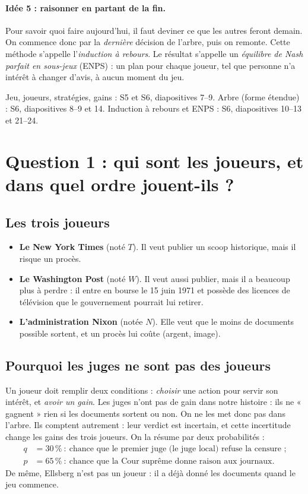 \documentclass[11pt,a4paper]{article}
\theoremstyle{definition}
\begin{document}
\paragraph{Idée 5 : raisonner en partant de la fin.} Pour savoir quoi faire aujourd'hui, il faut deviner ce que les autres feront demain. On commence donc par la \emph{dernière} décision de l'arbre, puis on remonte. Cette méthode s'appelle l'\emph{induction à rebours}. Le résultat s'appelle un \emph{équilibre de Nash parfait en sous-jeux} (ENPS) : un plan pour chaque joueur, tel que personne n'a intérêt à changer d'avis, à aucun moment du jeu.

\begin{cours}
Jeu, joueurs, stratégies, gains : S5 et S6, diapositives 7--9. Arbre (forme étendue) : S6, diapositives 8--9 et 14. Induction à rebours et ENPS : S6, diapositives 10--13 et 21--24.
\end{cours}

\section{Question 1 : qui sont les joueurs, et dans quel ordre jouent-ils ?}

\subsection{Les trois joueurs}
\begin{itemize}[leftmargin=*,itemsep=2pt]
\item \textbf{Le New York Times} (noté $T$). Il veut publier un scoop historique, mais il risque un procès.
\item \textbf{Le Washington Post} (noté $W$). Il veut aussi publier, mais il a beaucoup plus à perdre : il entre en bourse le 15 juin 1971 et possède des licences de télévision que le gouvernement pourrait lui retirer.
\item \textbf{L'administration Nixon} (notée $N$). Elle veut que le moins de documents possible sortent, et un procès lui coûte (argent, image).
\end{itemize}

\subsection{Pourquoi les juges ne sont pas des joueurs}
Un joueur doit remplir deux conditions : \emph{choisir} une action pour servir son intérêt, et \emph{avoir un gain}. Les juges n'ont pas de gain dans notre histoire : ils ne « gagnent » rien si les documents sortent ou non. On ne les met donc pas dans l'arbre. Ils comptent autrement : leur verdict est incertain, et cette incertitude change les gains des trois joueurs. On la résume par deux probabilités :
\begin{align*}
q&=30\,\%\ :\ \text{chance que le premier juge (le juge local) refuse la censure ;}\\
p&=65\,\%\ :\ \text{chance que la Cour suprême donne raison aux journaux.}
\end{align*}
De même, Ellsberg n'est pas un joueur : il a déjà donné les documents quand le jeu commence.
\end{document}
